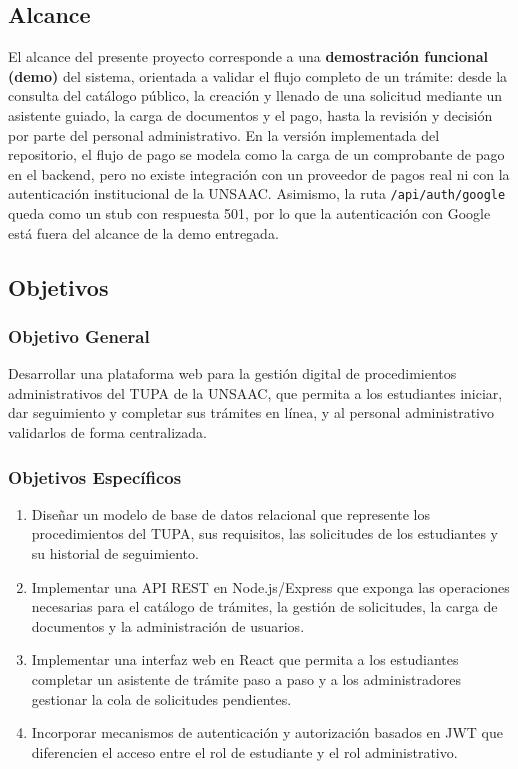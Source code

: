 \subsection{Alcance}
El alcance del presente proyecto corresponde a una \textbf{demostración
funcional (demo)} del sistema, orientada a validar el flujo completo de un
trámite: desde la consulta del catálogo público, la creación y llenado de una
solicitud mediante un asistente guiado, la carga de documentos y el pago, hasta
la revisión y decisión por parte del personal administrativo. En la versión
implementada del repositorio, el flujo de pago se modela como la carga de un
comprobante de pago en el backend, pero no existe integración con un proveedor
de pagos real ni con la autenticación institucional de la UNSAAC. Asimismo, la
ruta \texttt{/api/auth/google} queda como un stub con respuesta 501, por lo
que la autenticación con Google está fuera del alcance de la demo entregada.

\subsection{Objetivos}

\subsubsection{Objetivo General}
Desarrollar una plataforma web para la gestión digital de procedimientos
administrativos del TUPA de la UNSAAC, que permita a los estudiantes iniciar,
dar seguimiento y completar sus trámites en línea, y al personal administrativo
validarlos de forma centralizada.

\subsubsection{Objetivos Específicos}
\begin{enumerate}
    \item Diseñar un modelo de base de datos relacional que represente los
    procedimientos del TUPA, sus requisitos, las solicitudes de los
    estudiantes y su historial de seguimiento.
    \item Implementar una API REST en Node.js/Express que exponga las
    operaciones necesarias para el catálogo de trámites, la gestión de
    solicitudes, la carga de documentos y la administración de usuarios.
    \item Implementar una interfaz web en React que permita a los estudiantes
    completar un asistente de trámite paso a paso y a los administradores
    gestionar la cola de solicitudes pendientes.
    \item Incorporar mecanismos de autenticación y autorización basados en
    JWT que diferencien el acceso entre el rol de estudiante y el rol
    administrativo.
\end{enumerate}
